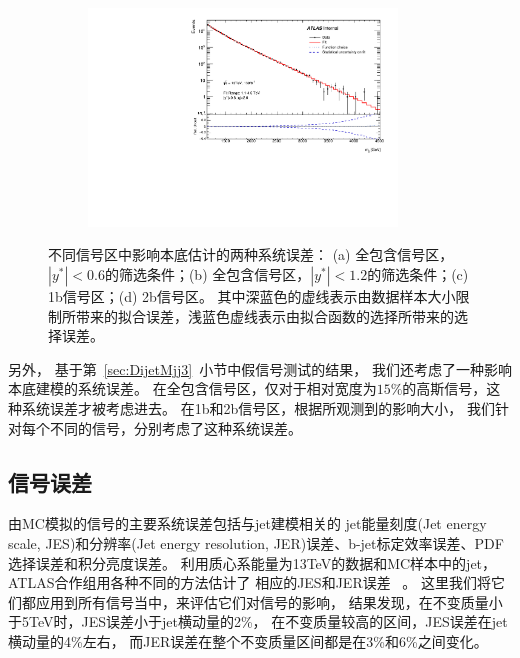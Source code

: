 \begin{figure}[!thbp]
\begin{subfigure}{.5\textwidth}
  \caption{}
  \end{subfigure}
  \begin{subfigure}{.5\textwidth}
  \centering
  \includegraphics[width=0.9\textwidth]{figuresDijet/07-SystematicUncertainties/uncertmbb.pdf}
  \caption{}
  \end{subfigure}
  \caption{
   不同信号区中影响本底估计的两种系统误差：
   (a) 全包含信号区，$|y^*|<0.6$的筛选条件；(b) 全包含信号区，$|y^*|<1.2$的筛选条件；(c) 1b信号区；(d) 2b信号区。
   其中深蓝色的虚线表示由数据样本大小限制所带来的拟合误差，浅蓝色虚线表示由拟合函数的选择所带来的选择误差。
}
\label{fig:Syst1}
\end{figure}



另外，
基于第~\ref{sec:DijetMjj3}~小节中假信号测试的结果，
我们还考虑了一种影响本底建模的系统误差。 
在全包含信号区，仅对于相对宽度为$15\%$的高斯信号，这种系统误差才被考虑进去。
在1b和2b信号区，根据所观测到的影响大小，
我们针对每个不同的信号，分别考虑了这种系统误差。

\subsection{信号误差} 
\label{sec:DijetSysSignal}

由MC模拟的信号的主要系统误差包括与jet建模相关的
jet能量刻度(Jet energy scale, JES)和分辨率(Jet energy resolution, JER)误差、b-jet标定效率误差、PDF选择误差和积分亮度误差。
利用质心系能量为13TeV的数据和MC样本中的jet，ATLAS合作组用各种不同的方法估计了
相应的JES和JER误差
~\cite{PERF-2016-04}。
这里我们将它们都应用到所有信号当中，来评估它们对信号的影响，
结果发现，在不变质量小于5TeV时，JES误差小于jet横动量的2\%，
在不变质量较高的区间，JES误差在jet横动量的4\%左右，
而JER误差在整个不变质量区间都是在3\%和6\%之间变化。

